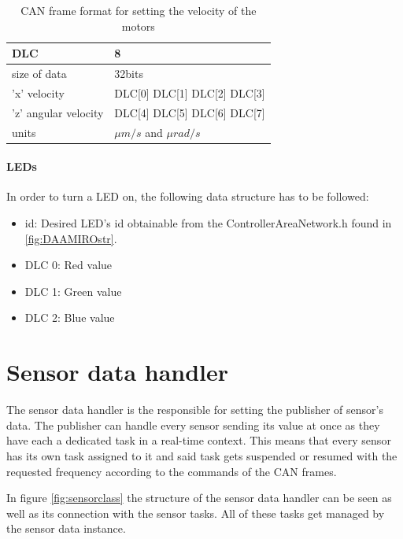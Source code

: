 \documentclass[12pt]{report}%
\begin{document}
\begin{table}[h!]
\centering
\begin{tabular}{|l|l|}
	\hline
	DLC										&	8														\\	\hline
	size of data					&	32bits											\\	\hline
	'x' velocity					&	DLC[0] DLC[1] DLC[2] DLC[3]	\\	\hline
	'z'	angular velocity	&	DLC[4] DLC[5] DLC[6] DLC[7]	\\	\hline
	units									&	$\mu m/s$ and $\mu rad/s$		\\	\hline
\end{tabular}
\caption{\label{tab:setvelocity} CAN frame format for setting the velocity of the motors}
\end{table}

\subsubsection{LEDs}
\label{sub:CANleds}
In order to turn a LED on, the following data structure has to be followed:

\begin{itemize}
	\item id: Desired LED's id obtainable from the ControllerAreaNetwork.h found in \ref{fig:DAAMIROstr}.
	\item DLC 0: Red value
	\item DLC 1: Green value
	\item DLC 2: Blue value
\end{itemize}

\chapter{Sensor data handler}
\label{chap:sensorDH}
The sensor data handler is the responsible for setting the publisher of sensor's data. The publisher can handle every sensor sending its value at once as they have each a dedicated task in a real-time context. This means that every sensor has its own task assigned to it and said task gets suspended or resumed with the requested frequency according to the commands of the CAN frames.

In figure \ref{fig:sensorclass} the structure of the sensor data handler can be seen as well as its connection with the sensor tasks. All of these tasks get managed by the sensor data instance.
\end{document}

